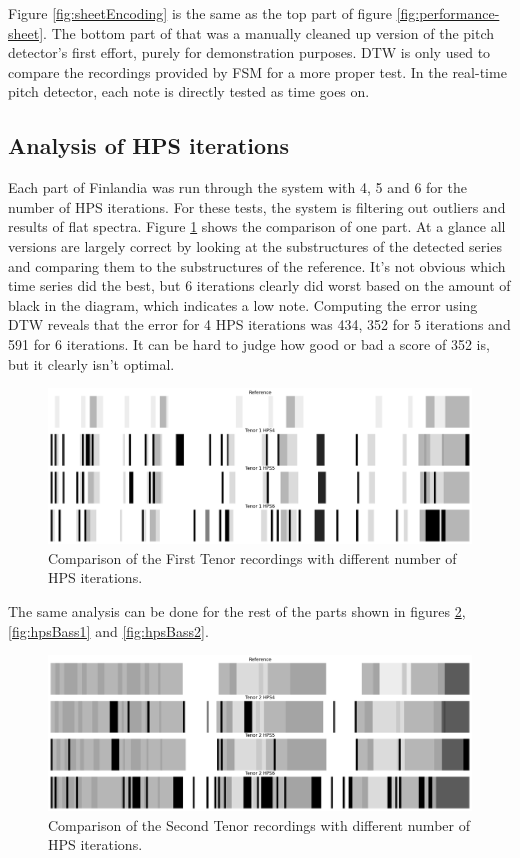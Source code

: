 Figure \ref{fig:sheetEncoding} is the same as the top part of figure \ref{fig:performance-sheet}. The bottom part of that was a manually cleaned up version of the pitch detector's first effort, purely for demonstration purposes. DTW is only used to compare the recordings provided by FSM for a more proper test. In the real-time pitch detector, each note is directly tested as time goes on.

\subsection{Analysis of HPS iterations}
Each part of Finlandia was run through the system with 4, 5 and 6 for the number of HPS iterations. For these tests, the system is filtering out outliers and results of flat spectra. Figure \ref{fig:hpsTenor1} shows the comparison of one part. At a glance all versions are largely correct by looking at the substructures of the detected series and comparing them to the substructures of the reference. It's not obvious which time series did the best, but 6 iterations clearly did worst based on the amount of black in the diagram, which indicates a low note. Computing the error using DTW reveals that the error for 4 HPS iterations was 434, 352 for 5 iterations and 591 for 6 iterations. It can be hard to judge how good or bad a score of 352 is, but it clearly isn't optimal.

\begin{figure}[ht]
    \centering
    \includegraphics[width=\textwidth]{./images/hpsTenor1.png}
    \caption{Comparison of the First Tenor recordings with different number of HPS iterations. \label{fig:hpsTenor1}}
\end{figure}

The same analysis can be done for the rest of the parts shown in figures \ref{fig:hpsTenor2}, \ref{fig:hpsBass1} and \ref{fig:hpsBass2}.

\begin{figure}[ht]
    \centering
    \includegraphics[width=\textwidth]{./images/hpsTenor2.png}
    \caption{Comparison of the Second Tenor recordings with different number of HPS iterations. \label{fig:hpsTenor2}}
\end{figure}


